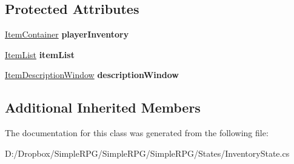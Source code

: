 \subsection*{Protected Attributes}
\begin{DoxyCompactItemize}
\item 
\hypertarget{class_simple_r_p_g_1_1_states_1_1_inventory_state_aa5316f2c76266582d48e44d711d484d8}{\hyperlink{class_simple_r_p_g_1_1_item_container}{Item\+Container} {\bfseries player\+Inventory}}\label{class_simple_r_p_g_1_1_states_1_1_inventory_state_aa5316f2c76266582d48e44d711d484d8}

\item 
\hypertarget{class_simple_r_p_g_1_1_states_1_1_inventory_state_ade61f6d43d5d01beaf81c2542f6a4c80}{\hyperlink{class_simple_r_p_g_1_1_windows_1_1_item_list}{Item\+List} {\bfseries item\+List}}\label{class_simple_r_p_g_1_1_states_1_1_inventory_state_ade61f6d43d5d01beaf81c2542f6a4c80}

\item 
\hypertarget{class_simple_r_p_g_1_1_states_1_1_inventory_state_a82b7015c1fd0c9f7f79bb8eb20f63959}{\hyperlink{class_simple_r_p_g_1_1_windows_1_1_item_description_window}{Item\+Description\+Window} {\bfseries description\+Window}}\label{class_simple_r_p_g_1_1_states_1_1_inventory_state_a82b7015c1fd0c9f7f79bb8eb20f63959}

\end{DoxyCompactItemize}
\subsection*{Additional Inherited Members}


The documentation for this class was generated from the following file\+:\begin{DoxyCompactItemize}
\item 
D\+:/\+Dropbox/\+Simple\+R\+P\+G/\+Simple\+R\+P\+G/\+Simple\+R\+P\+G/\+States/Inventory\+State.\+cs\end{DoxyCompactItemize}
